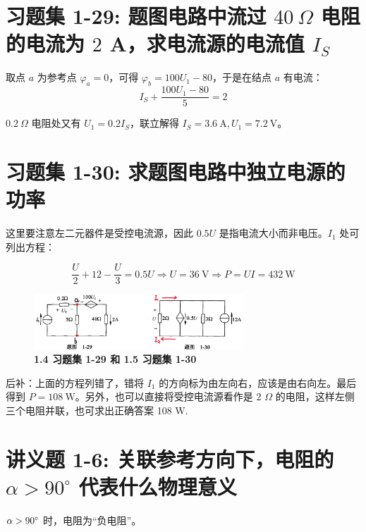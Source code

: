 \documentclass[UTF8]{report}
\theoremstyle{MyLineTheoremStyle} %
\theoremstyle{MyBlockTheoremStyle} %
\theoremstyle{MySubsubsectionStyle} %
\begin{document}
\section{习题集 1-29: 题图电路中流过 $40\ \Omega$ 电阻的电流为 $2$ A，求电流源的电流值 $I_S$}

取点 $a$ 为参考点 $\varphi_a = 0$，可得 $\varphi_b = 100U_1 - 80$，于是在结点 $a$ 有电流：
\begin{equation*}
I_S + \frac{100U_1 - 80}{5} = 2
\end{equation*}

$0.2\ \Omega$ 电阻处又有 $U_1 = 0.2 I_S$，联立解得 $I_S = 3.6 \ \mathrm{A}, U_1 = 7.2 \ \mathrm{V}$。

\section{习题集 1-30: 求题图电路中独立电源的功率}

这里要注意左二元器件是受控电流源，因此 $0.5U$ 是指电流大小而非电压。$I_1$ 处可列出方程：

\begin{equation*}
\frac{U}{2} + 12 - \frac{U}{3} = 0.5U \Longrightarrow U = 36 \ \mathrm{V} \Longrightarrow P = UI = 432 \ \mathrm{W}
\end{equation*}

\begin{figure}[H]\centering
\includegraphics[width=0.7\textwidth]{assets/1/94b342032a5f6622a60b3c9d99e37993.png}
\caption{\bfseries 1.4 习题集 1-29 和 1.5 习题集 1-30}
\end{figure}

{\par\color{gray}\small
后补：上面的方程列错了，错将 $I_1$ 的方向标为由左向右，应该是由右向左。最后得到 $P = 108\ \mathrm{W}$。另外，也可以直接将受控电流源看作是 2 $\Omega$ 的电阻，这样左侧三个电阻并联，也可求出正确答案 108 W.
\par}


\section{讲义题 1-6: 关联参考方向下，电阻的 $\alpha > 90^\circ$ 代表什么物理意义}

$\alpha > 90 \text{\textdegree}$ 时，电阻为“负电阻”。
\end{document}

